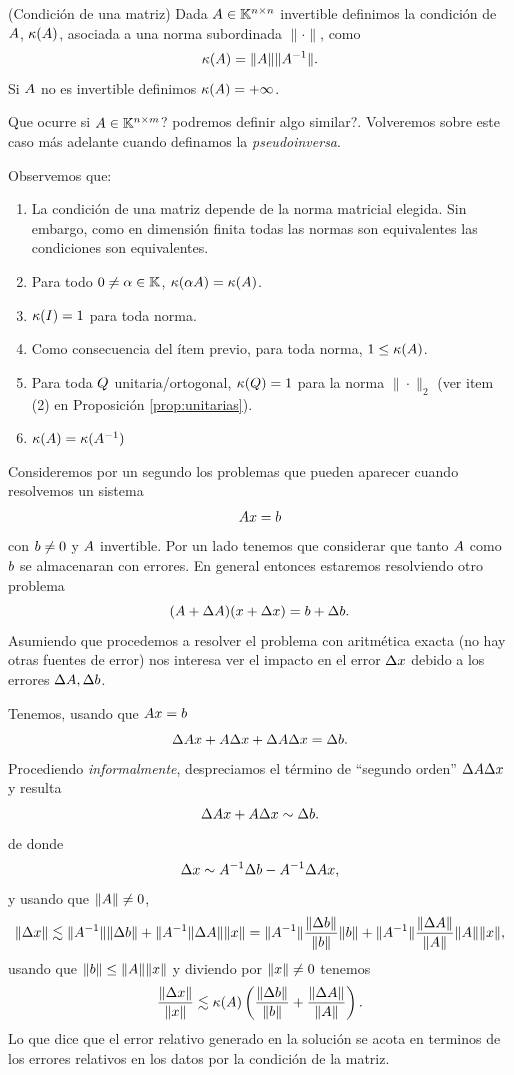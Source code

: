 \begin{definicion}{(Condición de una matriz)}
Dada $\Ab\in \Knn$ invertible definimos la condición de $\Ab$, $\kappa(\Ab)$, asociada a una norma subordinada $\|\cdot\|$, como
$$
\kappa(\Ab)=\|\Ab\|\|\Ab^{-1}\|.
$$
Si $\Ab$ no es invertible definimos $\kappa(\Ab)=+\infty$.

\end{definicion}
Que ocurre si $\Ab\in \K^{n\times m}$? podremos definir algo similar?.  Volveremos sobre este caso m\'as adelante cuando definamos la \emph{pseudoinversa}.
\begin{observacion}
\label{rem:deCondicion}
Observemos que:
\begin{enumerate}
 \item La condición de una matriz depende de la norma matricial elegida. Sin embargo, como en dimensión finita todas las normas son equivalentes las condiciones son equivalentes.
\item Para todo $\cero\neq \alpha\in \K$, $\kappa(\alpha\Ab)=\kappa(\Ab)$.
\item $\kappa(\Ib)=1$ para toda norma.
 \item Como consecuencia del ítem previo, para toda norma, $1\le \kappa(\Ab)$.
\item Para toda $\Qb$ unitaria/ortogonal, $\kappa(\Qb)=1$ para la norma $\|\cdot\|_2$ (ver item (2) en Proposición \ref{prop:unitarias}).
\item $\kappa(\Ab)=\kappa(\Ab^{-1})$
\end{enumerate}
\end{observacion}
Consideremos por un segundo los problemas que pueden aparecer cuando resolvemos un sistema
$$
\Ab\xb=\bb
$$
con $\bb\neq\cero$ y $\Ab$ invertible.
Por un lado tenemos que considerar que tanto $\Ab$ como $\bb$ se almacenaran con errores. En general entonces estaremos resolviendo otro problema
$$
(\Ab+\Delta\Ab)(\xb+\Delta \xb)=
\bb +\Delta \bb.
$$
Asumiendo que procedemos a resolver el problema con aritmética exacta (no hay otras fuentes de error) nos interesa ver el impacto en el error $\Delta \xb$ debido a los errores $\Delta \Ab,\Delta \bb$.

Tenemos, usando que $\Ab\xb=\bb$
$$
\Delta \Ab\xb+\Ab\Delta\xb+\Delta \Ab\Delta \xb=\Delta \bb.
$$
Procediendo \emph{informalmente}, despreciamos el término de ``segundo orden'' $\Delta \Ab\Delta \xb$ y resulta
$$
\Delta \Ab\xb+\Ab\Delta\xb \sim \Delta \bb.
$$
de donde
$$
\Delta \xb\sim \Ab^{-1}\Delta \bb-\Ab^{-1}\Delta \Ab\xb,
$$
y usando que $\|\Ab\|\neq 0$,
$$
\|\Delta \xb\|\lesssim \|\Ab^{-1}\|\|\Delta \bb\|+\|\Ab^{-1}\|\Delta \Ab\|\|\xb\|=\|\Ab^{-1}\|\frac{\|\Delta \bb\|}{\|\bb\|}\|\bb\|+\|\Ab^{-1}\|\frac{\|\Delta \Ab\|}{\|\Ab\|}\|\Ab\|\|\xb\|,
$$
usando que $\|\bb\|\le \|\Ab\|\|\xb\|$ y diviendo por $\|\xb\|\neq \cero$ tenemos
$$\frac{\|\Delta \xb\|}{\|\xb\|}\lesssim \kappa(\Ab)\left(\frac{\|\Delta \bb\|}{\|\bb\|}+ \frac{\|\Delta \Ab\|}{\|\Ab\|}\right).$$
Lo que dice que el error  relativo generado en la solución  se acota en terminos de los errores relativos en los datos por la condición de la matriz.

